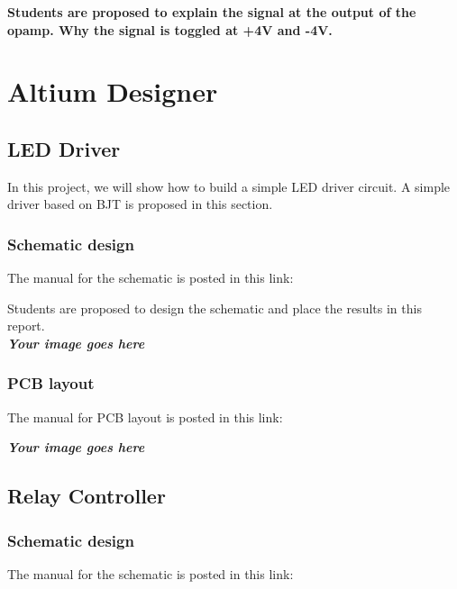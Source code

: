 \textbf{Students are proposed to explain the signal at the output of the opamp. Why the signal is toggled at +4V and -4V.}


\section{Altium Designer}
\subsection{LED Driver}
In this project, we will show how to build a simple LED driver circuit. A simple driver based on BJT is proposed in this section.

\subsubsection{Schematic design}
The manual for the schematic is posted in this link:

\begin{center}
\end{center}

Students are proposed to design the schematic and place the results in this report.\\

\textbf{\textit{Your image goes here}}

\subsubsection{PCB layout}
The manual for PCB layout is posted in this link:\\

\begin{center}
\end{center}

\textbf{\textit{Your image goes here}}

\subsection{Relay Controller}

\subsubsection{Schematic design}
The manual for the schematic is posted in this link:

\begin{center}
\end{center}

